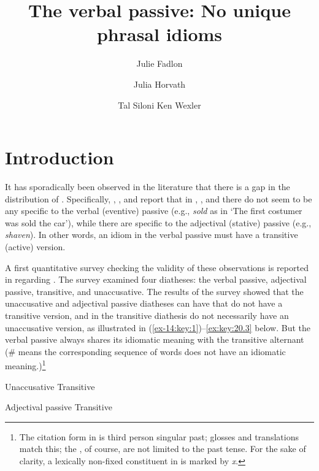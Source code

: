 \documentclass[output=paper]{langsci/langscibook}
\author{Julie Fadlon\affiliation{Tel Aviv University}\and
        Julia Horvath\affiliation{Tel Aviv University}\and
        Tal Siloni\affiliation{Tel Aviv University}\lastand
        Ken Wexler\affiliation{Massachusetts Institute of Technology}}
\title{The verbal passive: No unique phrasal idioms}
\begin{document}
\glsresetall

\section{Introduction}

It has sporadically been observed in the literature that there is a gap in the
distribution of . Specifically, \citet{DubSim1996}, \citet{Marantz1997},
and \textcite{Ruwet1991} report that in , , and
 there do not seem to be any  specific to
the verbal (eventive) passive (e.g., \emph{sold} as in ‘The first costumer was
sold the car’), while there are  specific to the adjectival (stative)
passive (e.g., \emph{shaven}). In other words, an idiom in the verbal passive
must have a transitive (active) version.

A first quantitative survey checking the validity of these observations is
reported in \citet{HorSil2009} regarding . The survey examined four
diatheses: the verbal passive, adjectival passive, transitive, and
unaccusative. The results of the survey showed that the unaccusative and
adjectival passive diatheses can have  that do not have a transitive
version, and  in the transitive diathesis do not necessarily have an
unaccusative version, as illustrated in (\ref{ex-14:key:1})--\eqref{ex:key:20.3} below. But the verbal passive
always shares its idiomatic meaning with the transitive alternant (\# means the
corresponding sequence of words does not have an idiomatic
meaning.)\footnote{The citation form in  is third person singular
    past; glosses and translations match this; the , of course, are not
    limited to the past tense. For the sake of clarity, a lexically non-fixed
    constituent in   is marked by \emph{x}.}

\ea\label{ex-14:key:1} 
    \ea Unaccusative
    \ex Transitive
    \z
\z

\ea\label{ex:key:20.2} 
    \ea Adjectival passive
    \newpage
    \ex Transitive
    \z
\z
\end{document}
